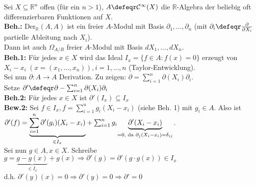 \begin{nnBsp}
  Sei $X \subseteq \mathbb{R}^n$ offen (für ein $n>1$), $A \defeqr
  \mathcal{C}^{\infty}(X)$ die $\mathbb{R}$-Algebra der beliebig oft
  differenzierbaren Funktionen auf $X$.\\
  \textbf{Beh.:} $\mbox{Der}_{\mathbb{R}}(A,A)$ ist ein freier $A$-Modul mit
  Basis $\partial_1, \dots , \partial_n$ (mit $\partial_i \defeqr 
  \frac{\partial}{\partial X_i}$ partielle Ableitung nach $X_i$).\\
  Dann ist auch $\Omega_{A/R}$ freier $A$-Modul mit Basis $d X_1, \dots , d
  X_n$.\\
  \textbf{Beh.1:} Für jedes $x \in X$ wird das Ideal $I_x = \{ f \in A: f(x) = 0
  \}$ erzeugt von $X_i - x_i \; (x = (x_1, \dots , x_n)), i = 1 , \dots , n$
  (Taylor-Entwicklung).\\
  Sei nun $\partial: A \to A$ Derivation. Zu zeigen: $\partial = \sum_{i = 1}^n
  \partial(X_i) \partial_i$.\\
  Setze $\partial' \defeqr \partial - \sum_{i = 1}^n \partial(X_i) \partial_i$\\
  \textbf{Beh.2:} Für jedes $x \in X$ ist $\partial'(I_x) \subseteq I_x$\\
  \textbf{Bew.2:} Sei $f \in I_x, f = \sum_{i = 1}^n g_i (X_i - x_i)$ (siehe
  Beh. 1) mit $g_i \in A$. Also ist $\partial'(f) = \underset{\in
  I_x}{\underbrace{\sum_{i = 1}^n
  \partial'(g_i)(X_i - x_i)}} + \sum_{i = 1}^n g_i \underset{\scriptsize=0,
  \mbox{ da } \partial_j(X_i-x_i)=\delta_{ij}}{\underbrace{\partial'(X_i -
  x_i)}}$.\\
  Sei nun $g \in A, x \in X$.
  Schreibe $g = \underset{\in I_x}{\underbrace{g - g(x)}} + g(x) \Rightarrow
  \partial'(g) = \partial'(g \cdot g(x)) \in I_x$\\
  d.h. $\partial'(y)(x) = 0 \Rightarrow \partial'(y) = 0 \Rightarrow \partial' =
  0$
\end{nnBsp}

